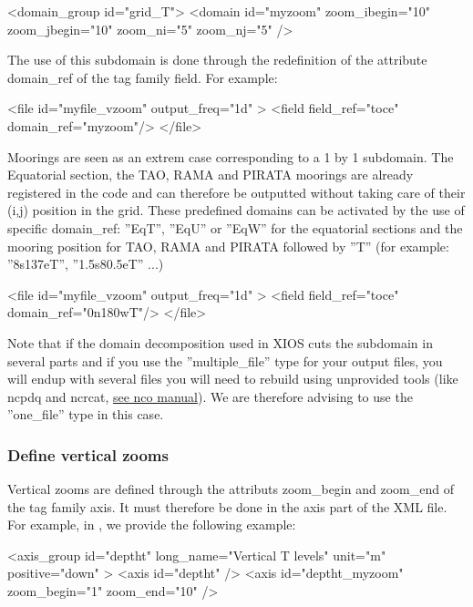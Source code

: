 \documentclass[../tex_main/NEMO_manual]{subfiles}
\begin{document}
\begin{xmllines}
<domain_group id="grid_T">
	<domain id="myzoom" zoom_ibegin="10" zoom_jbegin="10" zoom_ni="5" zoom_nj="5" />
\end{xmllines}

The use of this subdomain is done through the redefinition of the attribute domain\_ref of the tag family field.
For example:

\begin{xmllines}
<file id="myfile_vzoom" output_freq="1d" >
	<field field_ref="toce" domain_ref="myzoom"/>
</file>
\end{xmllines}

Moorings are seen as an extrem case corresponding to a 1 by 1 subdomain. 
The Equatorial section, the TAO, RAMA and PIRATA moorings are already registered in the code and
can therefore be outputted without taking care of their (i,j) position in the grid.
These predefined domains can be activated by the use of specific domain\_ref:
''EqT'', ''EqU'' or ''EqW'' for the equatorial sections and
the mooring position for TAO, RAMA and PIRATA followed by ''T'' (for example: ''8s137eT'', ''1.5s80.5eT'' ...)

\begin{xmllines}
<file id="myfile_vzoom" output_freq="1d" >
	<field field_ref="toce" domain_ref="0n180wT"/>
</file>
\end{xmllines}

Note that if the domain decomposition used in XIOS cuts the subdomain in several parts and if 
you use the ''multiple\_file'' type for your output files, 
you will endup with several files you will need to rebuild using unprovided tools (like ncpdq and ncrcat, 
\href{http://nco.sourceforge.net/nco.html#Concatenation}{see nco manual}).
We are therefore advising to use the ''one\_file'' type in this case.

\subsubsection{Define vertical zooms}

Vertical zooms are defined through the attributs zoom\_begin and zoom\_end of the tag family axis.
It must therefore be done in the axis part of the XML file.
For example, in , we provide the following example:

\begin{xmllines}
<axis_group id="deptht" long_name="Vertical T levels" unit="m" positive="down" >
	<axis id="deptht" />
	<axis id="deptht_myzoom" zoom_begin="1" zoom_end="10" />
\end{xmllines}
\end{document}
